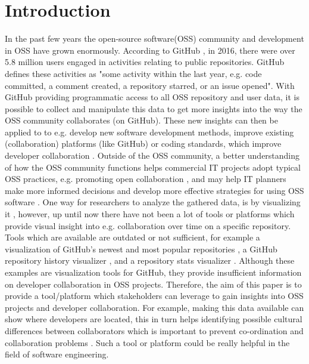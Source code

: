 \documentclass[acmtog, authorversion]{acmart}
\begin{document}
\section{Introduction}
In the past few years the open-source software(OSS) community and development in OSS have grown enormously.
According to GitHub \cite{GHOctoverse}, in 2016, there were over 5.8 million users engaged in activities relating to public repositories.
GitHub defines these activities as "some activity within the last year, e.g. code committed, a comment created, a repository starred, or an issue opened".
With GitHub providing programmatic access to all OSS repository and user data\cite{GHAPI}, it is possible to collect and manipulate this data to get more insights into the way the OSS community collaborates (on GitHub).
These new insights can then be applied to to e.g. develop new software development methods, improve existing (collaboration) platforms (like GitHub) or coding standards, which improve developer collaboration \cite{Jermakovics2013}.
Outside of the OSS community, a better understanding of how the OSS community functions helps commercial IT projects adopt typical OSS practices, e.g. promoting open collaboration \cite{Kalliamvakou:2015:OSC:2818754.2818825}, and may help IT planners make more informed decisions and develop more effective strategies for using OSS software \cite{madey2002}. 
One way for researchers to analyze the gathered data, is by visualizing it \cite{Heller}, however, up until now there have not been a lot of tools or platforms which provide visual insight into e.g. collaboration over time on a specific repository.
Tools which are available are outdated \cite{Heller} or not sufficient, for example a visualization of GitHub's newest and most popular repositories \cite{donnemartin2016}, a GitHub repository history visualizer \cite{artzub2013}, and a repository stats visualizer \cite{bajaj2013}.
Although these examples are visualization tools for GitHub, they provide insufficient information on developer collaboration in OSS projects.
Therefore, the aim of this paper is to provide a tool/platform which stakeholders can leverage to gain insights into OSS projects and developer collaboration.
For example, making this data available can show where developers are located, this in turn helps identifying possible cultural differences between collaborators which is important to prevent co-ordination and collaboration problems \cite{Mishra2014}.
Such a tool or platform could be really helpful in the field of software engineering.
\end{document}
